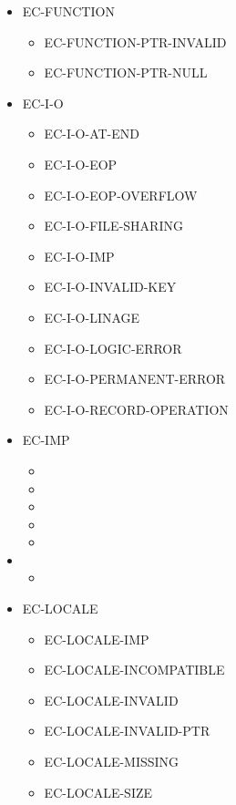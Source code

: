 \begin{itemize}
\item EC-FUNCTION
  \begin{itemize}
  \item EC-FUNCTION-PTR-INVALID
  \item EC-FUNCTION-PTR-NULL
  \end{itemize}

\item EC-I-O
  \begin{itemize}
  \item EC-I-O-AT-END
  \item EC-I-O-EOP
  \item EC-I-O-EOP-OVERFLOW
  \item EC-I-O-FILE-SHARING
  \item EC-I-O-IMP
  \item EC-I-O-INVALID-KEY
  \item EC-I-O-LINAGE
  \item EC-I-O-LOGIC-ERROR
  \item EC-I-O-PERMANENT-ERROR
  \item EC-I-O-RECORD-OPERATION
  \end{itemize}

\item EC-IMP
  \begin{itemize}
  \item {}
  \item {}
  \item {}
  \item {}
  \item {}
  \end{itemize}

\item {}
  \begin{itemize}
  \item {}
  \end{itemize}

\item EC-LOCALE
  \begin{itemize}
  \item EC-LOCALE-IMP
  \item EC-LOCALE-INCOMPATIBLE
  \item EC-LOCALE-INVALID
  \item EC-LOCALE-INVALID-PTR
  \item EC-LOCALE-MISSING
  \item EC-LOCALE-SIZE
  \end{itemize}


\end{itemize}
